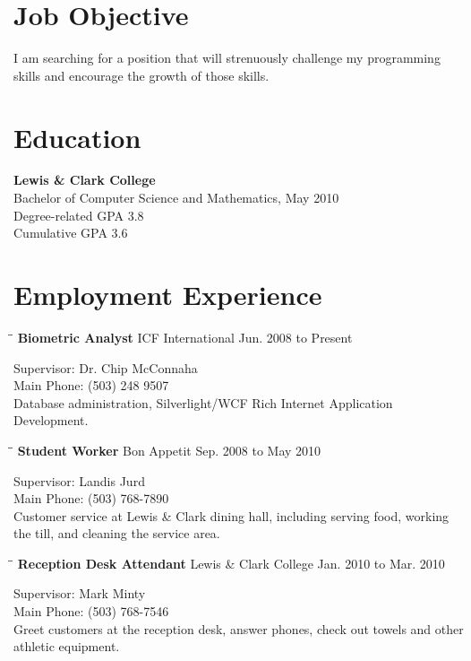\documentclass{res}
\newcommand{\employment}[6]{\vspace{-0.1in}\begin{tabbing}\hspace{2.3in}\= \hspace{2.6in}\= \kill
    \textbf{#1} \>#2     \>#3\\
                             \end{tabbing}\vspace{-20pt}
                             Supervisor: #4\\
                            Main Phone: #5\\
                             #6}
\begin{document}
 


\address{\bf  PRESENT ADDRESS\\0615 SW Palatine Hill Rd.\\Portland, OR 97219\\(503) 887-4920}
\address{\bf PERMANENT ADDRESS \\ 6830 SW 26th Ave. \\ Portland, OR 97219 \\  (541) 312-8219}
                                  
\begin{resume}

\section{Job Objective}
    I am searching for a position that will strenuously challenge my programming
    skills and encourage the growth of those skills.
 
\section{Education}          
    \textbf{Lewis \& Clark College} \\
    Bachelor of Computer Science and Mathematics, May 2010 \\
    Degree-related GPA 3.8 \\
    Cumulative GPA 3.6 \\
 
\section{Employment Experience}
    \employment{Biometric Analyst}{ICF International}{Jun. 2008 to Present}
    {Dr. Chip McConnaha}{(503) 248 9507}{Database administration,
    Silverlight/WCF Rich Internet Application Development.}

    \employment{Student Worker}{Bon Appetit}{Sep. 2008 to
    May 2010}{Landis Jurd}{(503) 768-7890}{Customer service at Lewis \& Clark
    dining hall, including serving food, working the till, and cleaning the
    service area.}

    \employment{Reception Desk Attendant}{Lewis \& Clark College}{Jan. 2010 to
    Mar. 2010}{Mark Minty}{(503) 768-7546}{Greet customers at the reception
    desk, answer phones, check out towels and other athletic equipment.}


\end{resume}
\end{document}
